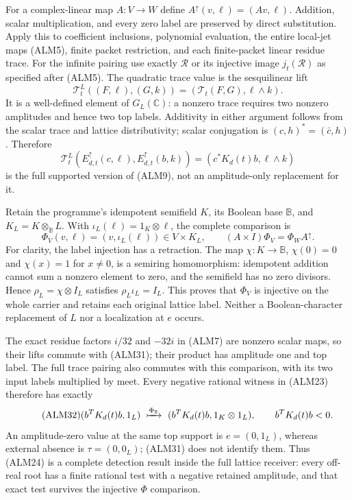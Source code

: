 For a complex-linear map $A:V\to W$ define
$A^\uparrow(v,\ell)=(Av,\ell)$. Addition, scalar multiplication, and
every zero label are preserved by direct substitution. Apply this to
coefficient inclusions, polynomial evaluation, the entire local-jet
maps (ALM5), finite packet restriction, and each finite-packet linear
residue trace. For the infinite pairing use exactly $\mathscr R$ or
its injective image $j_t(\mathscr R)$ as specified after (ALM5).
The quadratic trace value is the sesquilinear lift
\begin{equation}\tag{ALM30}
 \mathcal T_t^L((F,\ell),(G,k))
            =(\mathcal T_t(F,G),\ell\wedge k).
\end{equation}
It is a well-defined element of $G_L(\mathbb C)$: a nonzero trace
requires two nonzero amplitudes and hence two top labels. Additivity
in either argument follows from the scalar trace and lattice
distributivity; scalar conjugation is
$(c,h)^*=(\bar c,h)$. Therefore
\[
 \mathcal T_t^L(E_{d,t}^\uparrow(c,\ell),
                       E_{d,t}^\uparrow(b,k))
                   =(c^*K_d(t)b,\ell\wedge k)
\]
is the full supported version of (ALM9), not an amplitude-only
replacement for it.

Retain the programme's idempotent semifield $K$, its Boolean base
$\mathbb B$, and $K_L=K\otimes_{\mathbb B}L$. With
$\iota_L(\ell)=1_K\otimes\ell$, the complete comparison is
\begin{equation}\tag{ALM31}
 \Phi_V(v,\ell)=(v,\iota_L(\ell))\in V\times K_L,\qquad
 (A\times I)\Phi_V=\Phi_W A^\uparrow.
\end{equation}
For clarity, the label injection has a retraction. The map
$\chi:K\to\mathbb B$, $\chi(0)=0$ and $\chi(x)=1$ for $x\ne0$,
is a semiring homomorphism: idempotent addition cannot sum a nonzero
element to zero, and the semifield has no zero divisors. Hence
$\rho_L=\chi\otimes I_L$ satisfies
$\rho_L\iota_L=I_L$. This proves that $\Phi_V$ is injective on the
whole carrier and retains each original lattice label. Neither a
Boolean-character replacement of $L$ nor a localization at $e$ occurs.

The exact residue factors $i/32$ and $-32i$ in (ALM7) are nonzero
scalar maps, so their lifts commute with (ALM31); their product has
amplitude one and top label. The full trace pairing also commutes
with this comparison, with its two input labels multiplied by meet.
Every negative rational witness in (ALM23) therefore has exactly
\begin{equation}\tag{ALM32}
 (b^TK_d(t)b,1_L)\ \xmapsto{\Phi_{\mathbb R}}\
       (b^TK_d(t)b,1_K\otimes1_L),\qquad b^TK_d(t)b<0.
\end{equation}
An amplitude-zero value at the same top support is
$e=(0,1_L)$, whereas external absence is $\tau=(0,0_L)$; (ALM31)
does not identify them. Thus (ALM24) is a complete detection result
inside the full lattice receiver: every off-real root has a finite
rational test with a negative retained amplitude, and that exact test
survives the injective $\Phi$ comparison.
